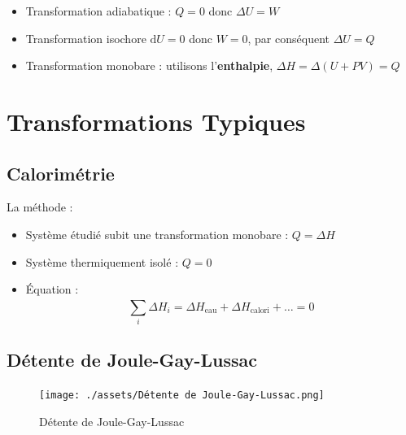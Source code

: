 \begin{itemize}

    \item Transformation adiabatique : $Q = 0$ donc $\Delta U = W$ 
    \item Transformation isochore $\mathrm{d} U = 0$ donc $W = 0$, par conséquent $\Delta U = Q$
    \item Transformation monobare : utilisons l'\textbf{enthalpie}, $\Delta H = \Delta (U+PV) = Q$

\end{itemize}




\newpage
\section{Transformations Typiques} %
\label{sec:Transformations Typiques}

\subsection{Calorimétrie} %
\label{sub:Calorimétrie}

La méthode : 
\begin{itemize}

    \item Système étudié subit une transformation monobare : $Q = \Delta H$ 
    \item Système thermiquement isolé : $Q = 0$ 
    \item Équation : 
      \begin{equation}
        \sum_{i}^{} \Delta H_i = \Delta H _{\text{eau}} + \Delta H _{\text{calori}} + \dots = 0
      \end{equation}

\end{itemize}
\subsection{Détente de Joule-Gay-Lussac} %
\begin{figure}[H] %
  \centering
  \texttt{[image: ./assets/Détente de Joule-Gay-Lussac.png]}
  \caption{Détente de Joule-Gay-Lussac}
\end{figure}

